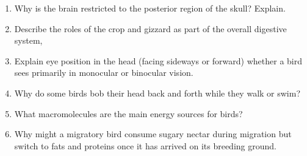 \documentclass[nofonts, letterpaper]{tufte-handout}
\begin{document}
\begin{enumerate}
\item Why is the brain restricted to the posterior region of the skull? Explain.

\item Describe the roles of the crop and gizzard as part of the overall digestive system,


\item Explain eye position in the head (facing sideways or forward) whether a bird sees primarily in monocular or binocular vision.

\item Why do some birds bob their head back and forth while they walk or swim?

\item What macromolecules are the main energy sources for birds?

\item Why might a migratory bird consume sugary nectar during migration but switch to fats and proteins once it has arrived on its breeding ground.

\end{enumerate}
\end{document}
